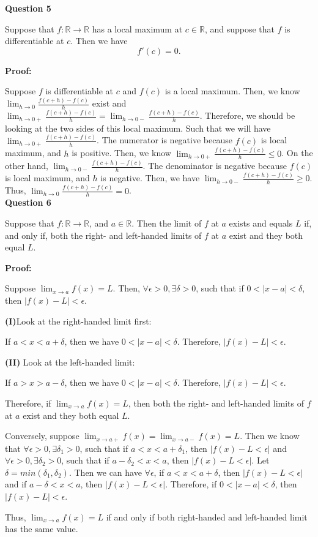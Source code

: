 \documentclass[a4paper,12pt]{report}
\newcommand{\R}{\mathbb{R}}
\begin{document}
\noindent
\textbf{Question 5}

\noindent
Suppose that $f:\R\to\R$
has a local maximum at $c\in\R$, and suppose 
that $f$ is differentiable at $c$. Then
we have
\[
f'(c)=0.
\]

\noindent
\textbf{Proof: }

\noindent
Suppose $f$ is differentiable at $c$ and $f(c)$ is a local maximum. Then, we know $\displaystyle{\lim_{h\to 0}}\frac{f(c+h)-f(c)}{h}$ exist and $\displaystyle{\lim_{h\to 0+}}\frac{f(c+h)-f(c)}{h}=\displaystyle{\lim_{h\to 0-}}\frac{f(c+h)-f(c)}{h}$. Therefore, we should be looking at the two sides of this local maximum. Such that we will have $\displaystyle{\lim_{h\to 0+}}\frac{f(c+h)-f(c)}{h}$. The numerator is negative because $f(c)$ is local maximum, and $h$ is positive. Then, we know $\displaystyle{\lim_{h\to 0+}}\frac{f(c+h)-f(c)}{h}\leq 0$. On the other hand, $\displaystyle{\lim_{h\to 0-}}\frac{f(c+h)-f(c)}{h}$. The denominator is negative because $f(c)$ is local maximum, and $h$ is negative. Then, we have $\displaystyle{\lim_{h\to 0-}}\frac{f(c+h)-f(c)}{h}\geq 0$. Thus, $\displaystyle{\lim_{h\to 0}}\frac{f(c+h)-f(c)}{h} = 0$. \\

\noindent
\textbf{Question 6}

\noindent
Suppose that $f:\R\to\R$,
and $a\in\R$. Then the limit of $f$ at $a$ exists
and equals $L$ if, and only if, both the 
right- and left-handed limits of $f$ at $a$ 
exist and they both equal $L$.

\noindent
\textbf{Proof: }

\noindent
Suppose $\displaystyle{\lim_{x\to a}}f(x)=L$. Then, $\forall \epsilon>0, \exists \delta>0$, such that if $0<|x-a|<\delta$, then $|f(x)-L|<\epsilon$. 

\noindent
\textbf{(I)}Look at the right-handed limit first: 

\noindent
If $a<x<a+\delta$, then we have $0<|x-a|<\delta$. Therefore, $|f(x)-L|<\epsilon$.

\noindent
\textbf{(II)} Look at the left-handed limit:

\noindent
If $a>x>a-\delta$, then we have $0<|x-a|<\delta$. Therefore, $|f(x)-L|<\epsilon$.

\noindent
Therefore, if $\displaystyle{\lim_{x\to a}}f(x)=L$, then both the 
right- and left-handed limits of $f$ at $a$ 
exist and they both equal $L$.

\noindent
Conversely, suppose $\displaystyle{\lim_{x\to a+}}f(x)=\displaystyle{\lim_{x\to a-}}f(x)=L$. Then we know that $\forall \epsilon >0, \exists \delta_1>0$, such that if $a<x<a+\delta_1$, then $|f(x)-L<\epsilon|$ and $\forall \epsilon >0, \exists \delta_2>0$, such that if $a-\delta_2<x<a$, then $|f(x)-L<\epsilon|$. Let $\delta=min(\delta_1,\delta_2)$. Then we can have $\forall \epsilon$, if $a<x<a+\delta$, then $|f(x)-L<\epsilon|$ and if $a-\delta<x<a$, then $|f(x)-L<\epsilon|$. Therefore, if $0<|x-a|<\delta$, then $|f(x)-L|<\epsilon$. 

\noindent
Thus, $\displaystyle{\lim_{x\to a}}f(x)=L$ if and only if both right-handed and left-handed limit has the same value.
\end{document}
